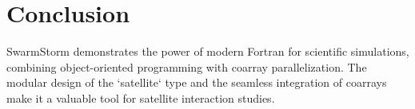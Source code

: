% 

\section{Conclusion}
SwarmStorm demonstrates the power of modern Fortran for scientific simulations, combining object-oriented programming with coarray parallelization. The modular design of the `satellite` type and the seamless integration of coarrays make it a valuable tool for satellite interaction studies.

\endinput  %
